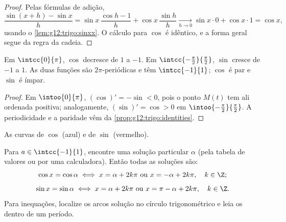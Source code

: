 \begin{proof}
Pelas fórmulas de adição,
\[
\frac{\sin(x+h) - \sin x}{h}
= \sin x\,\frac{\cos h - 1}{h} + \cos x\,\frac{\sin h}{h}
\xrightarrow[h\to0]{} \sin x \cdot 0 + \cos x \cdot 1 = \cos x,
\]
usando o \cref{lem:g12:trigo:sinxx}. O cálculo para $\cos$ é idêntico, e a
forma geral segue da regra da cadeia.
\end{proof}

\begin{proposition}[Variação]\label{prop:g12:trigo:variations}
Em $\intcc{0}{\pi}$, $\cos$ decresce de $1$ a $-1$. Em
$\intcc{-\frac\pi2}{\frac\pi2}$, $\sin$ cresce de $-1$ a $1$. As duas
funções são $2\pi$-periódicas e têm  $\intcc{-1}{1}$; $\cos$ é par e
$\sin$ é ímpar.
\end{proposition}

\begin{proof}
Em $\intoo{0}{\pi}$, $(\cos)' = -\sin < 0$, pois o ponto $M(t)$ tem ali
ordenada positiva; analogamente, $(\sin)' = \cos > 0$ em
$\intoo{-\frac\pi2}{\frac\pi2}$. A periodicidade e a paridade vêm da
\cref{prop:g12:trigo:identities}.
\end{proof}

\begin{omfigure}

{\small As curvas de $\cos$ (azul) e de $\sin$ (vermelho).}
\end{omfigure}

\begin{method}[Resolver $\cos x = a$ e $\sin x = a$]\label{met:g12:trigo:equations}
Para $a \in \intcc{-1}{1}$, encontre uma solução particular $\alpha$ (pela
tabela de valores ou por uma calculadora). Então todas as soluções são:
\[
\cos x = \cos\alpha \iff x = \alpha + 2k\pi \text{ ou } x = -\alpha + 2k\pi,
\quad k \in \Z;
\]
\[
\sin x = \sin\alpha \iff x = \alpha + 2k\pi \text{ ou } x = \pi - \alpha + 2k\pi,
\quad k \in \Z.
\]
Para inequações, localize os arcos solução no círculo trigonométrico e leia
os  dentro de um período.
\end{method}


